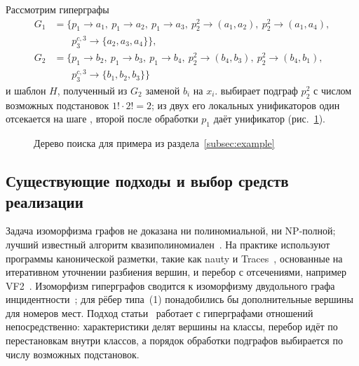 Рассмотрим гиперграфы
\begin{align*}
    G_1 & = \{p_1 \to a_1,\ p_1 \to a_2,\ p_1 \to a_3,\ p_2^2 \to (a_1, a_2),\ p_2^2 \to (a_1, a_4), \\
        & \phantom{{}=\{} p_3^{c,3} \to \{a_2, a_3, a_4\}\},                                          \\
    G_2 & = \{p_1 \to b_2,\ p_1 \to b_3,\ p_1 \to b_4,\ p_2^2 \to (b_4, b_3),\ p_2^2 \to (b_4, b_1), \\
        & \phantom{{}=\{} p_3^{c,3} \to \{b_1, b_2, b_3\}\}
\end{align*}
и шаблон $H$, полученный из $G_2$ заменой $b_i$ на $x_i$.
 выбирает подграф $p_2^2$ с числом возможных подстановок $1! \cdot 2! = 2$; из двух его локальных унификаторов один отсекается на шаге , второй после обработки $p_1$ даёт унификатор (рис.~\ref{fig:tree}).

\begin{figure}[ht]
    \centering
    \caption{Дерево поиска \ISOMn{} для примера из раздела~\ref{subsec:example}}
    \label{fig:tree}
\end{figure}

\subsection{Существующие подходы и выбор средств реализации}

Задача изоморфизма графов не доказана ни полиномиальной, ни NP-полной; лучший известный алгоритм квазиполиномиален~\cite{Babai2016}.
На практике используют программы канонической разметки, такие как nauty и Traces~\cite{McKayPiperno2014}, основанные на итеративном уточнении разбиения вершин, и перебор с отсечениями, например VF2~\cite{Cordella2004}.
Изоморфизм гиперграфов сводится к изоморфизму двудольного графа инцидентности~\cite{Luks1999}; для рёбер типа~(1) понадобились бы дополнительные вершины для номеров мест.
Подход статьи~\cite{KosovskayaIsom} работает с гиперграфами отношений непосредственно: характеристики делят вершины на классы, перебор идёт по перестановкам внутри классов, а порядок обработки подграфов выбирается по числу возможных подстановок.

